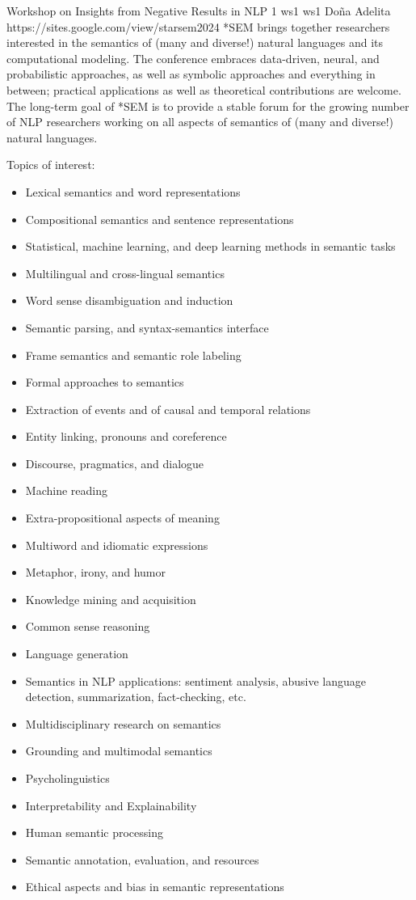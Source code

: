 \begin{wsschedulenolist}
{Workshop on Insights from Negative Results in NLP}
{1}
{ws1}
{ws1}
{Do\~na Adelita}
{https://sites.google.com/view/starsem2024}
    *SEM brings together researchers interested in the semantics of (many and diverse!) natural languages and its computational modeling. The conference embraces data-driven, neural, and probabilistic approaches, as well as symbolic approaches and everything in between; practical applications as well as theoretical contributions are welcome. The long-term goal of *SEM is to provide a stable forum for the growing number of NLP researchers working on all aspects of semantics of (many and diverse!) natural languages.

    Topics of interest:

\begin{itemize}
\setlength{\itemsep}{-0.3ex}
\item Lexical semantics and word representations
\item Compositional semantics and sentence representations
\item Statistical, machine learning, and deep learning methods in semantic tasks
\item Multilingual and cross-lingual semantics
\item Word sense disambiguation and induction
\item Semantic parsing, and syntax-semantics interface
\item Frame semantics and semantic role labeling
\item Formal approaches to semantics
\item Extraction of events and of causal and temporal relations
\item Entity linking, pronouns and coreference
\item Discourse, pragmatics, and dialogue
\item Machine reading
\item Extra-propositional aspects of meaning
\item Multiword and idiomatic expressions
\item Metaphor, irony, and humor
\item Knowledge mining and acquisition
\item Common sense reasoning
\item Language generation
\item Semantics in NLP applications: sentiment analysis, abusive language detection, summarization, fact-checking, etc.
\item Multidisciplinary research on semantics
\item Grounding and multimodal semantics
\item Psycholinguistics
\item Interpretability and Explainability
\item Human semantic processing
\item Semantic annotation, evaluation, and resources
\item Ethical aspects and bias in semantic representations
\end{itemize}
\end{wsschedulenolist}
